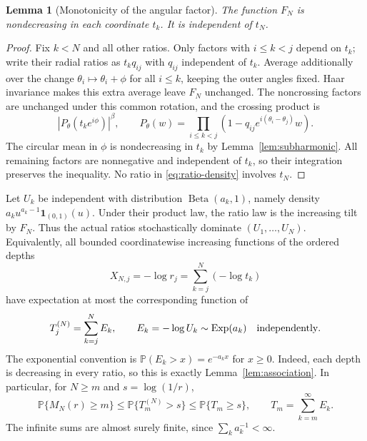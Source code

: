 \documentclass[11pt,a4paper]{article}
\numberwithin{equation}{section}
\newtheorem{lemma}[theorem]{Lemma}
\theoremstyle{definition}
\theoremstyle{remark}
\newcommand{\Pbb}{\mathbb P}
\newcommand{\ind}{\mathbf 1}
\DeclareMathOperator{\Exp}{Exp}
\DeclareMathOperator{\Beta}{Beta}
\begin{document}
\begin{lemma}[Monotonicity of the angular factor]\label{lem:angular}
The function $F_N$ is nondecreasing in each coordinate $t_k$. It is
independent of $t_N$.
\end{lemma}
\begin{proof}
Fix $k<N$ and all other ratios. Only factors with $i\le k<j$ depend on
$t_k$; write their radial ratios as $t_kq_{ij}$ with $q_{ij}$ independent
of $t_k$. Average additionally over the change
$\theta_i\mapsto\theta_i+\phi$ for all $i\le k$, keeping the outer
angles fixed. Haar invariance makes this extra average leave $F_N$
unchanged. The noncrossing factors are unchanged under this common
rotation, and the crossing product is
\[
 \left|P_\theta(t_ke^{i\phi})\right|^\beta,
 \qquad
 P_\theta(w)=\prod_{i\le k<j}
 (1-q_{ij}e^{i(\theta_i-\theta_j)}w).
\]
The circular mean in $\phi$ is nondecreasing in $t_k$ by
Lemma~\ref{lem:subharmonic}. All remaining factors are nonnegative and
independent of $t_k$, so their integration preserves the inequality.
No ratio in \eqref{eq:ratio-density} involves $t_N$.
\end{proof}

Let $U_k$ be independent with distribution $\Beta(a_k,1)$, namely density
$a_ku^{a_k-1}\ind_{(0,1)}(u)$. Under their product law, the ratio law is
the increasing tilt by $F_N$. Thus the actual ratios stochastically
dominate $(U_1,\ldots,U_N)$. Equivalently, all bounded coordinatewise
increasing functions of the ordered depths
\[
 X_{N,j}=-\log r_j=\sum_{k=j}^N(-\log t_k)
\]
have expectation at most the corresponding function of
\begin{equation}\label{eq:finite-depth-comparison}
 T_j^{(N)}=\sum_{k=j}^N E_k,
 \qquad E_k=-\log U_k\sim\Exp(a_k)\quad\hbox{independently}.
\end{equation}
The exponential convention is $\Pbb(E_k>x)=e^{-a_kx}$ for $x\ge0$.
Indeed, each depth is decreasing in every ratio, so this is exactly
Lemma~\ref{lem:association}. In particular, for $N\ge m$ and $s=\log(1/r)$,
\begin{equation}\label{eq:count-comparison}
 \Pbb\{M_N(r)\ge m\}
 \le \Pbb\{T_m^{(N)}>s\}
 \le \Pbb\{T_m\ge s\},
 \qquad T_m=\sum_{k=m}^{\infty}E_k.
\end{equation}
The infinite sums are almost surely finite, since $\sum_k a_k^{-1}<\infty$.
\end{document}
